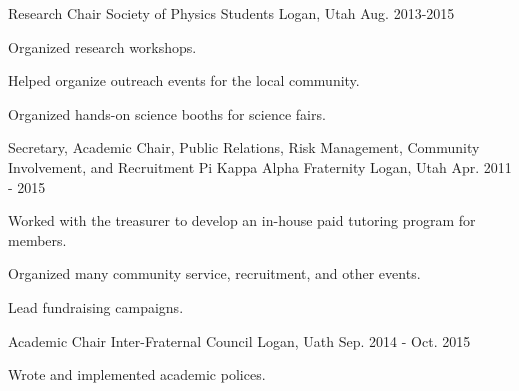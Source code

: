 


\begin{cventries}


\cventry
{Research Chair} %
{Society of Physics Students} %
{Logan, Utah} %
{Aug. 2013-2015} %
{ %
\begin{cvitems}
\item {Organized research workshops.}
\item {Helped organize outreach events for the local community.}
\item {Organized hands-on science booths for science fairs.}
\end{cvitems}
}


\cventry
{Secretary, Academic Chair, Public Relations, Risk Management, Community Involvement, and Recruitment } %
{Pi Kappa Alpha Fraternity } %
{Logan, Utah} %
{Apr. 2011 - 2015} %
{ %
\begin{cvitems}
\item {Worked with the treasurer to develop an in-house paid tutoring program for members.}
\item {Organized many community service, recruitment, and other events.}
\item {Lead fundraising campaigns.}
\end{cvitems}
}


\cventry
{Academic Chair} %
{Inter-Fraternal Council} %
{Logan, Uath} %
{Sep. 2014 - Oct. 2015} %
{ %
\begin{cvitems}
\item {Wrote and implemented academic polices.}
\end{cvitems}
}


\end{cventries}
